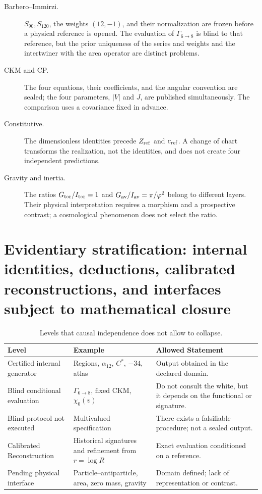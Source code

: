\begin{description}
 \item[Barbero--Immirzi.] \(S_{90},S_{120}\), the weights
 \((12,-1)\), and their normalization are frozen before a physical reference is opened. The
 evaluation of \(\Gamma_{6\to8}\) is blind to that reference,
 but the prior uniqueness of the series and weights and the intertwiner with the area
 operator are distinct problems.
 \item[CKM and CP.] The four equations, their coefficients, and the
 angular convention are sealed; the four parameters,
 \(|V|\) and \(J\), are published simultaneously. The comparison uses a covariance fixed in advance.
 \item[Constitutive.] The dimensionless identities precede
 \(Z_{\rm ref}\) and \(c_{\rm ref}\). A change of chart transforms the
 realization, not the identities, and does not create four independent
 predictions.
 \item[Gravity and inertia.] The ratios
 \(G_{\rm tor}/I_{\rm tor}=1\) and
 \(G_{\rm av}/I_{\rm av}=\pi/\varphi^2\) belong to different layers.
 Their physical interpretation requires a morphism and a prospective contrast; a
 cosmological phenomenon does not select the ratio.
\end{description}

\section{Evidentiary stratification: internal identities, deductions, calibrated reconstructions, and interfaces subject to mathematical closure}
\label{sec:cinco-niveles-independencia}

\begin{table}[htbp]
\centering
\caption{Levels that causal independence does not allow to collapse.}
\label{tab:cinco-niveles-independencia}
\small
\begin{tabularx}{\textwidth}{@{}L{0.25\textwidth}YL{0.27\textwidth}@{}}
\toprule
Level & Example & Allowed Statement\\
\midrule
Certified internal generator&
Regions, \(\alpha_{12}\), \(C^\ast\), \(-34\), atlas&
Output obtained in the declared domain.\\
Blind conditional evaluation&
\(\Gamma_{6\to8}\), fixed CKM, \(\chi_0(v)\)&
Do not consult the white, but it depends on the functional or signature.\\
Blind protocol not executed&
Multivalued specification&
There exists a falsifiable procedure; not a sealed output.\\
Calibrated Reconstruction&
Historical signatures and refinement from \(r=\log R\)&
Exact evaluation conditioned on a reference.\\
Pending physical interface&
Particle--antiparticle, area, zero mass, gravity&
Domain defined; lack of representation or contrast.\\
\bottomrule
\end{tabularx}
\end{table}
